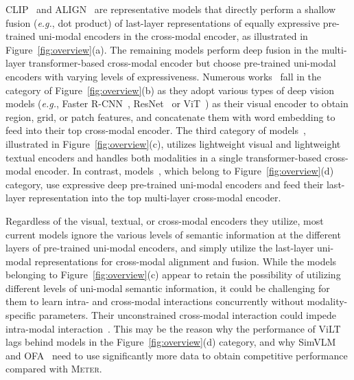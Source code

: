 \documentclass[letterpaper]{article} %
\newcommand{\metername}[0]{\textsc{Meter}}
\newcommand{\eg}[0]{\textit{e.g.},}
\begin{document}
CLIP~\citep{radford2021learning} and ALIGN~\citep{jia2021scaling} are representative models that directly perform a shallow fusion (\eg{} dot product) of last-layer representations of equally expressive pre-trained uni-modal encoders in the cross-modal encoder, as illustrated in Figure~\ref{fig:overview}(a).
The remaining models perform deep fusion in the multi-layer transformer-based cross-modal encoder but choose pre-trained uni-modal encoders with varying levels of expressiveness. 
Numerous works~\citep{li2019visualbert,su2019vl,li2020unicoder,chen2020uniter,li2020oscar,zhou2020unified,zhang2021vinvl,pmlr-v139-cho21a,huang2020pixel,huang2021seeing,shen2021much,liu2021kd,li2021unimo,xia2021xgpt,ni2021m3p,chen2022pali,wang2022git,alayrac2022flamingo}
fall in the category of Figure~\ref{fig:overview}(b) as they adopt various types of deep vision models (\eg{} Faster R-CNN~\citep{ren2015faster}, ResNet~\citep{he2016deep} or ViT~\citep{dosovitskiy2020image}) as their visual encoder to obtain region, grid, or patch features, and concatenate them with word embedding to feed into their top cross-modal encoder.
The third category of models~\citep{kim2021vilt, wang2021simvlm, wang2021distilled, wang2022OFA}, illustrated in Figure~\ref{fig:overview}(c), utilizes lightweight visual and lightweight textual encoders and handles both modalities in a single transformer-based cross-modal encoder. 
In contrast, models~\citep{lu2019vilbert, tan2019lxmert, kamath2021mdetr, li2021align, zeng2021multi, dou2021meter, wang2021vlmo, li2022blip, li2022unimo, wang2022image, yu2022coca, li2022mplug}, which belong to Figure~\ref{fig:overview}(d) category, use expressive deep pre-trained uni-modal encoders and feed their last-layer representation into the top multi-layer cross-modal encoder.

Regardless of the visual, textual, or cross-modal encoders they utilize, most current models ignore the various levels of semantic information at the different layers of pre-trained uni-modal encoders, and simply utilize the last-layer uni-modal representations for cross-modal alignment and fusion. 
While the models belonging to Figure~\ref{fig:overview}(c) appear to retain the possibility of utilizing different levels of uni-modal semantic information, it could be challenging for them to learn intra- and cross-modal interactions concurrently without modality-specific parameters. Their unconstrained cross-modal interaction could impede intra-modal interaction~\citep{dou2021meter, du2022survey}.
This may be the reason why the performance of ViLT lags behind models in the Figure~\ref{fig:overview}(d) category, and why SimVLM~\citep{wang2021simvlm} and OFA~\citep{wang2022OFA} need to use significantly more data to obtain competitive performance compared with \metername{}.
\end{document}
